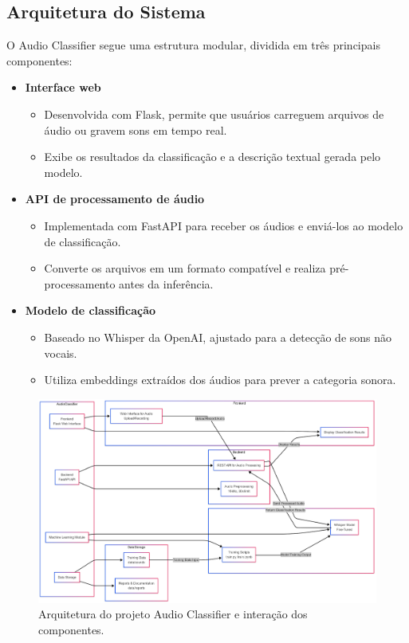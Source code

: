 \documentclass[conference]{IEEEtran}
\begin{document}
\subsection{Arquitetura do Sistema}
O Audio Classifier segue uma estrutura modular, dividida em três principais componentes:

\begin{itemize}
\item \textbf{Interface web}
  \begin{itemize}
  \item Desenvolvida com Flask, permite que usuários carreguem arquivos de áudio ou gravem sons em tempo real.
  \item Exibe os resultados da classificação e a descrição textual gerada pelo modelo.
  \end{itemize}
\item \textbf{API de processamento de áudio}
  \begin{itemize}
  \item Implementada com FastAPI para receber os áudios e enviá-los ao modelo de classificação.
  \item Converte os arquivos em um formato compatível e realiza pré-processamento antes da inferência.
  \end{itemize}
\item \textbf{Modelo de classificação}
  \begin{itemize}
  \item Baseado no Whisper da OpenAI, ajustado para a detecção de sons não vocais.
  \item Utiliza embeddings extraídos dos áudios para prever a categoria sonora.
  \end{itemize}
\end{itemize}

\begin{figure}[htbp]
\centerline{\includegraphics[width=\linewidth]{figures/figure1.png}}
\caption{Arquitetura do projeto Audio Classifier e interação dos componentes.}
\label{fig1}
\end{figure}
\end{document}
